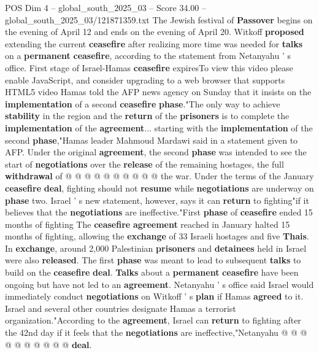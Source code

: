 \begin{textsample}{POS Dim 4 – global\_south\_2025\_03 – Score 34.00 – global\_south\_2025\_03/121871359.txt}
The Jewish festival of \textbf{Passover} begins on the evening of April 12 and ends on the evening of April 20.
Witkoff \textbf{proposed} extending the current \textbf{ceasefire} after realizing more time was needed for \textbf{talks} on a \textbf{permanent} \textbf{ceasefire}, according to the statement from Netanyahu ' s office.
First stage of Israel-Hamas \textbf{ceasefire} expiresTo view this video please enable JavaScript, and consider upgrading to a web browser that supports HTML5 video Hamas told the AFP news agency on Sunday that it insists on the \textbf{implementation} of a second \textbf{ceasefire} \textbf{phase}."The only way to achieve \textbf{stability} in the region and the \textbf{return} of the \textbf{prisoners} is to complete the \textbf{implementation} of the \textbf{agreement}... starting with the \textbf{implementation} of the second \textbf{phase},"Hamas leader Mahmoud Mardawi said in a statement given to AFP.
Under the original \textbf{agreement}, the second \textbf{phase} was intended to see the start of \textbf{negotiations} over the \textbf{release} of the remaining hostages, the full \textbf{withdrawal} of @ @ @ @ @ @ @ @ @ @ the war.
Under the terms of the January \textbf{ceasefire} \textbf{deal}, fighting should not \textbf{resume} while \textbf{negotiations} are underway on \textbf{phase} two.
Israel ' s new statement, however, says it can \textbf{return} to fighting"if it believes that the \textbf{negotiations} are ineffective."First \textbf{phase} of \textbf{ceasefire} ended 15 months of fighting The \textbf{ceasefire} \textbf{agreement} reached in January halted 15 months of fighting, allowing the \textbf{exchange} of 33 Israeli hostages and five \textbf{Thais}.
In \textbf{exchange}, around 2,000 Palestinian \textbf{prisoners} and \textbf{detainees} held in Israel were also \textbf{released}.
The first \textbf{phase} was meant to lead to subsequent \textbf{talks} to build on the \textbf{ceasefire} \textbf{deal}. \textbf{Talks} about a \textbf{permanent} \textbf{ceasefire} have been ongoing but have not led to an \textbf{agreement}.
Netanyahu ' s office said Israel would immediately conduct \textbf{negotiations} on Witkoff ' s \textbf{plan} if Hamas \textbf{agreed} to it.
Israel and several other countries designate Hamas a terrorist organization."According to the \textbf{agreement}, Israel can \textbf{return} to fighting after the 42nd day if it feels that the \textbf{negotiations} are ineffective,"Netanyahu @ @ @ @ @ @ @ @ @ @ \textbf{deal}.

\end{textsample}
